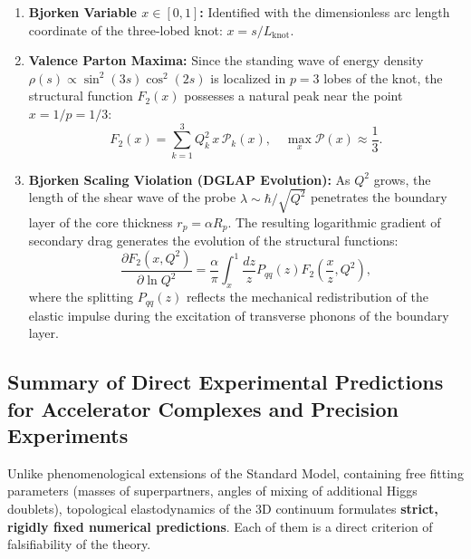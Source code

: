 \documentclass[12pt,a4paper]{article}
\begin{document}
\begin{enumerate}
\item \textbf{Bjorken Variable $x \in [0, 1]$:} Identified with the dimensionless arc length coordinate of the three-lobed knot: $x = s / L_{\text{knot}}$.
\item \textbf{Valence Parton Maxima:} Since the standing wave of energy density $\rho(s) \propto \sin^2(3s)\cos^2(2s)$ is localized in $p=3$ lobes of the knot, the structural function $F_2(x)$ possesses a natural peak near the point $x = 1/p = 1/3$:
\begin{equation}
F_2(x) = \sum_{k=1}^3 Q_k^2 \, x \, \mathcal{P}_k(x), \quad \max_x \mathcal{P}(x) \approx \frac{1}{3}.
\end{equation}
\item \textbf{Bjorken Scaling Violation (DGLAP Evolution):} As $Q^2$ grows, the length of the shear wave of the probe $\lambda \sim \hbar/\sqrt{Q^2}$ penetrates the boundary layer of the core thickness $r_p = \alpha R_p$. The resulting logarithmic gradient of secondary drag generates the evolution of the structural functions:
\begin{equation}
\frac{\partial F_2(x, Q^2)}{\partial \ln Q^2} = \frac{\alpha}{\pi} \int_x^1 \frac{dz}{z} P_{qq}(z) F_2\left(\frac{x}{z}, Q^2\right),
\end{equation}
where the splitting $P_{qq}(z)$ reflects the mechanical redistribution of the elastic impulse during the excitation of transverse phonons of the boundary layer.
\end{enumerate}

\subsection{Summary of Direct Experimental Predictions for Accelerator Complexes and Precision Experiments}
																			
Unlike phenomenological extensions of the Standard Model, containing free fitting parameters (masses of superpartners, angles of mixing of additional Higgs doublets), topological elastodynamics of the 3D continuum formulates \textbf{strict, rigidly fixed numerical predictions}. Each of them is a direct criterion of falsifiability of the theory.
																			
\end{document}
